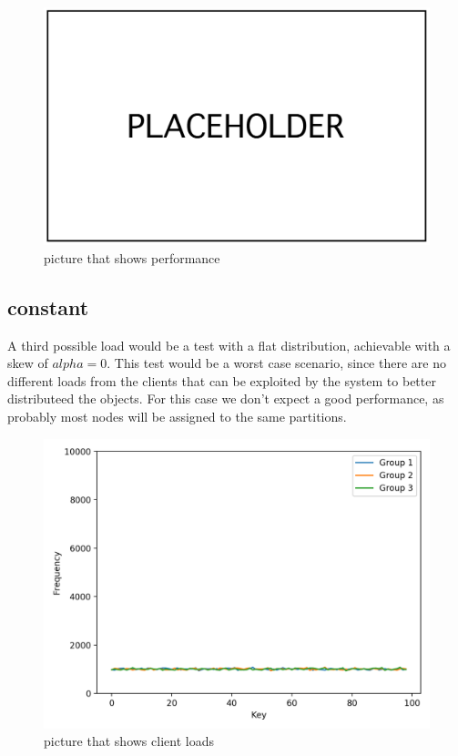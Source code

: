 \begin{figure}[!htb]
  \centering
  \includegraphics[width=\textwidth,height=\textheight,keepaspectratio]{img/placeholder.png}
  \caption[caption]{ picture that shows performance }
  \label{fig:global-skewed-performance}
\end{figure}

\subsection{constant}\label{sec:constant}
A third possible load would be a test with a flat distribution, achievable with a skew of $alpha = 0$. This test would be a worst case scenario, since there are no different loads from the clients that can be exploited by the system to better distributeed the objects. For this case we don't expect a good performance, as probably most nodes will be assigned to the same partitions.

\begin{figure}[!htb]
  \centering
  \includegraphics[width=\textwidth,height=\textheight,keepaspectratio]{img/clients_loads_constant.png}
  \caption[caption]{ picture that shows client loads }
  \label{fig:constant-loads}
\end{figure}

